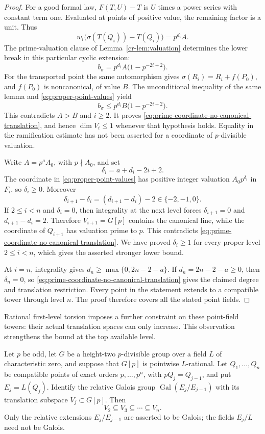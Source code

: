 \begin{proof}
For a good formal law, $F(T,U)-T$ is $U$ times a power series
with constant term one. Evaluated at points of positive value,
the remaining factor is a unit. Thus
\[
 w_i\bigl(\sigma(T(Q_i))-T(Q_i)\bigr)=p^{d_i}A.
\]
The prime-valuation clause of Lemma~\ref{cr-lem:valuation}
determines the lower break in this particular cyclic extension:
\[
 b_\sigma=p^{d_i}A\bigl(1-p^{-2i+2}\bigr).
\]
For the transported point the same automorphism gives
$\sigma(R_i)=R_i+f(P_0)$, and $f(P_0)$ is noncanonical, of
value $B$. The unconditional inequality of the same lemma and
\eqref{eq:proper-point-values} yield
\[
 b_\sigma\le p^{d_i}B\bigl(1-p^{-2i+2}\bigr).
\]
This contradicts $A>B$ and $i\ge2$. It proves
\eqref{eq:prime-coordinate-no-canonical-translation}, and hence
$\dim V_i\le1$ whenever that hypothesis holds. Equality in the
ramification estimate has not been asserted for a coordinate of
$p$-divisible valuation.

Write $A=p^aA_0$, with $p\nmid A_0$, and set
\[
 \delta_i=a+d_i-2i+2.
\]
The coordinate in \eqref{eq:proper-point-values} has positive
integer valuation $A_0p^{\delta_i}$ in $F_i$, so $\delta_i\ge0$.
Moreover
\[
 \delta_{i+1}-\delta_i=(d_{i+1}-d_i)-2\in\{-2,-1,0\}.
\]
If $2\le i<n$ and $\delta_i=0$, then integrality at the next
level forces $\delta_{i+1}=0$ and $d_{i+1}-d_i=2$.
Therefore $V_{i+1}=G[p]$ contains the canonical line, while
the coordinate of $Q_{i+1}$ has valuation prime to $p$.
This contradicts
\eqref{eq:prime-coordinate-no-canonical-translation}.
We have proved $\delta_i\ge1$ for every proper level
$2\le i<n$, which gives the asserted stronger lower bound.

At $i=n$, integrality gives $d_n\ge\max\{0,2n-2-a\}$.
If $d_n=2n-2-a\ge0$, then $\delta_n=0$, so
\eqref{eq:prime-coordinate-no-canonical-translation} gives the
claimed degree and translation restriction. Every point in the
statement extends to a compatible tower through level $n$.
The proof therefore covers all the stated point fields.
\end{proof}

Rational first-level torsion imposes a further constraint on these
point-field towers: their actual translation spaces can only increase.
This observation strengthens the bound at the top available level.

\begin{lemma}\label{lem:point-field-translation-persistence}
Let $p$ be odd, let $G$ be a height-two $p$-divisible group over a
field $L$ of characteristic zero, and suppose that $G[p]$ is
pointwise $L$-rational. Let $Q_1,\ldots,Q_n$ be compatible points
of exact orders $p,\ldots,p^n$, with $pQ_j=Q_{j-1}$, and put
$E_j=L(Q_j)$. Identify the relative Galois group
$\operatorname{Gal}(E_j/E_{j-1})$ with its translation subspace
$V_j\subset G[p]$. Then
\[
 V_2\subseteq V_3\subseteq\cdots\subseteq V_n.
\]
Only the relative extensions $E_j/E_{j-1}$ are asserted to be
Galois; the fields $E_j/L$ need not be Galois.
\end{lemma}

